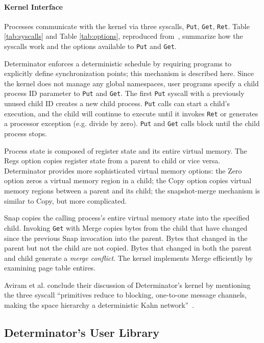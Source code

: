 


\paragraph{Kernel Interface} Processes communicate with the kernel via three
syscalls, {\tt Put}, {\tt Get}, {\tt Ret}. Table \ref{tab:syscalls} and Table
\ref{tab:options}, reproduced from~\cite{Aviram10}, summarize how the syscalls
work and the options available to {\tt Put} and {\tt Get}.

Determinator enforces a deterministic schedule by requiring programs to
explicitly define synchronization points; this mechanism is described here.
Since the kernel does not manage any global namespaces, user programs specify
a child process ID parameter to {\tt Put} and {\tt Get}. The first {\tt Put}
syscall with a previously unused child ID creates a new child process.
{\tt Put} calls can start a child's execution, and the child will continue to
execute until it invokes {\tt Ret} or generates a processor exception (e.g.
divide by zero). {\tt Put} and {\tt Get} calls block until the child process
stops.

Process state is composed of register state and its entire virtual memory.
The Regs option copies register state from a parent to child or vice versa.
Determinator provides more sophisticated virtual memory options: the Zero
option zeros a virtual memory region in a child; the Copy option copies
virtual memory regions between a parent and its child; the snapshot-merge
mechanism is similar to Copy, but more complicated.

Snap copies the calling process's entire virtual memory state into the specified
child. Invoking {\tt Get} with Merge copies bytes
from the child that have changed since the previous Snap invocation into the
parent. Bytes that changed in the parent but not the child are not copied. Bytes
that changed in both the parent and child generate a \emph{merge conflict}.
The kernel implements Merge efficiently by examining page table entires.

Aviram et al. conclude their discussion of Determinator's kernel by mentioning
the three syscall ``primitives reduce to blocking, one-to-one message channels,
making the space hierarchy a deterministic Kahn
network''~\cite{kahn1974semantics}.

\subsection{Determinator's User Library}

